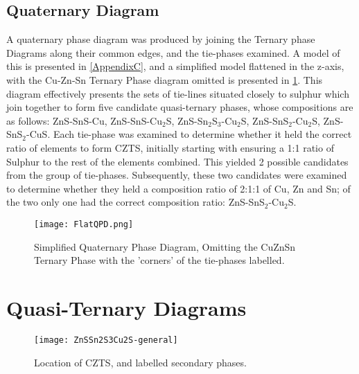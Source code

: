 
\subsection{Quaternary Diagram}

A quaternary phase diagram was produced by joining the Ternary phase Diagrams along their common edges, and the tie-phases examined. A model of this is presented in \ref{AppendixC}, and a simplified model flattened in the z-axis, with the Cu-Zn-Sn Ternary Phase diagram omitted is presented in \ref{fig:298KQPD}. This diagram effectively presents the sets of tie-lines situated closely to sulphur which join together to form five candidate quasi-ternary phases, whose compositions are as follows: ZnS-SnS-Cu, ZnS-SnS-Cu$_2$S, ZnS-Sn$_2$S$_3$-Cu$_2$S, ZnS-SnS$_2$-Cu$_2$S, ZnS-SnS$_2$-CuS. Each tie-phase was examined to determine whether it held the correct ratio of elements to form CZTS, initially starting with ensuring a 1:1 ratio of Sulphur to the rest of the elements combined. This yielded 2 possible candidates from the group of tie-phases. Subsequently, these two candidates were examined to determine whether they held a composition ratio of 2:1:1 of Cu, Zn and Sn; of the two only one had the correct composition ratio: ZnS-SnS$_2$-Cu$_2$S.


\begin{figure}[ht]
\centering
    \texttt{[image: FlatQPD.png]}
    \caption{Simplified Quaternary Phase Diagram, Omitting the CuZnSn Ternary Phase with the 'corners' of the tie-phases labelled.}
\label{fig:298KQPD}
\end{figure}

\section{Quasi-Ternary Diagrams}


\begin{figure}
\centering
 \texttt{[image: ZnSSn2S3Cu2S-general]}
    \caption{Location of CZTS, and labelled secondary phases.}
    \label{fig:ZnSSn2S3Cu2S}
\end{figure}
